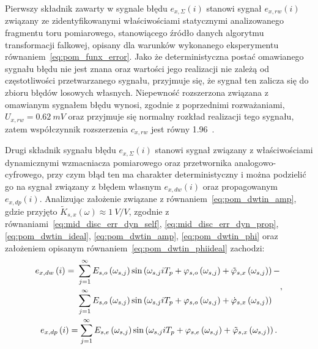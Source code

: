 Pierwszy składnik zawarty w sygnale błędu $e_{x,\Sigma}(i)$ stanowi sygnał $e_{x,rw}(i)$ związany ze zidentyfikowanymi właściwościami statycznymi analizowanego fragmentu toru pomiarowego, stanowiącego źródło danych algorytmu transformacji falkowej, opisany dla warunków wykonanego eksperymentu równaniem~\eqref{eq:pom_funx_error}. Jako że deterministyczna postać omawianego sygnału błędu nie jest znana oraz wartości jego realizacji nie zależą od częstotliwości przetwarzanego sygnału, przyjmuje się, że sygnał ten zalicza się do zbioru błędów losowych własnych. Niepewność rozszerzona związana z omawianym sygnałem błędu wynosi, zgodnie z poprzednimi rozważaniami, $U_{x,rw} = \qty{0.62}{mV}$ oraz przyjmuje się normalny rozkład realizacji tego sygnału, zatem współczynnik rozszerzenia $c_{x,rw}$ jest równy \num{1.96}~\cite{jcgm_guide}.

Drugi składnik sygnału błędu $e_{x,\Sigma}(i)$ stanowi sygnał związany z właściwościami dynamicznymi wzmacniacza pomiarowego oraz przetwornika analogowo-cyfrowego, przy czym błąd ten ma charakter deterministyczny i można podzielić go na sygnał związany z błędem własnym $e_{x,dw}(i)$ oraz propagowanym $e_{x,dp}(i)$. Analizując założenie związane z równaniem~\eqref{eq:pom_dwtin_amp}, gdzie przyjęto $\tilde{K}_{s,x}(\omega) \approx \qty{1}{V \per V}$, zgodnie z równaniami~\eqref{eq:mid_disc_err_dyn_self}, \eqref{eq:mid_disc_err_dyn_prop}, \eqref{eq:pom_dwtin_ideal}, \eqref{eq:pom_dwtin_amp}, \eqref{eq:pom_dwtin_phi} oraz założeniem opisanym równaniem~\eqref{eq:pom_dwtin_phiideal} zachodzi:
\begin{gather}
\begin{split}
e_{x,dw} \left(i\right) =~
& \sum _{j = 1} ^{\infty} E_{s,o} \left(\omega_{s,j}\right) \sin \left( \omega_{s,j} iT_{p} + \varphi_{s,o} \left(\omega_{s,j}\right) + \tilde{\varphi}_{s,x} \left(\omega_{s,j}\right) \right) - \\
& \sum _{j = 1} ^{\infty} E_{s,o} \left(\omega_{s,j}\right) \sin \left( \omega_{s,j} iT_{p} + \varphi_{s,o} \left(\omega_{s,j}\right) + \dot{\varphi}_{s,x} \left(\omega_{s,j}\right) \right)
\end{split}
\label{eq:pom_errx_dyn_self}, \\
e_{x,dp} \left(i\right) = \sum _{j = 1} ^{\infty} E_{s,e} \left(\omega_{s,j}\right) \sin \left( \omega_{s,j} iT_{p} + \varphi_{s,e} \left(\omega_{s,j}\right) + \tilde{\varphi}_{s,x} \left(\omega_{s,j}\right) \right) \label{eq:pom_errx_dyn_prop}.
\end{gather}

